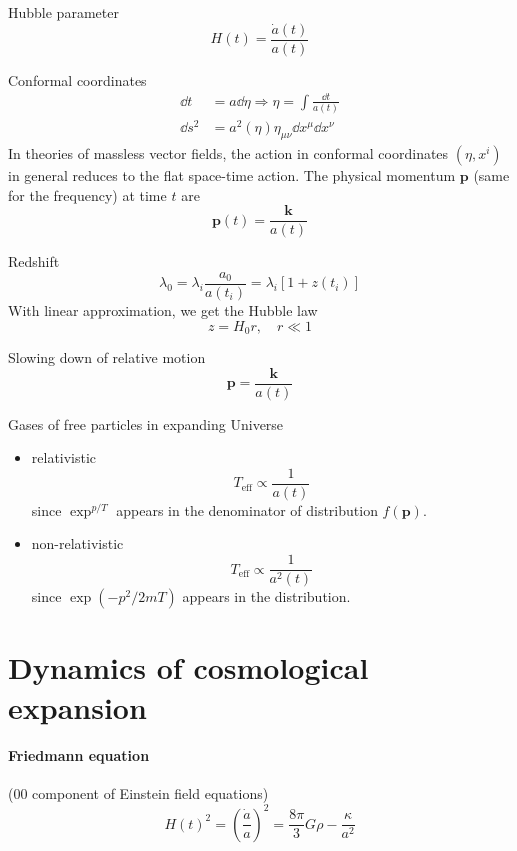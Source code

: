 \documentclass[12pt, a4paper, DIV=15]{article}
\numberwithin{equation}{section}
\newcommand{\eff}{\text{eff}}
\begin{document}
Hubble parameter
\begin{equation}
   H(t) = \frac{\dot a(t)}{a(t)}
\end{equation}

Conformal coordinates
\begin{align}
   \dd{t} &= a \dd{\eta} \Rightarrow \eta = \int \frac{\dd{t}}{a(t)}\\
   \dd{s^2} &= a^2(\eta) \eta_{\mu\nu} \dd{x^\mu} \dd{x^\nu}
\end{align}
In theories of massless vector fields, the action in conformal coordinates $(\eta, x^i)$ in general reduces to the flat space-time action. The physical momentum $\pmb{p}$ (same for the frequency) at time $t$ are
\begin{equation}
   \pmb{p} (t) = \frac{\pmb{k}}{a(t)}
\end{equation}

Redshift
\begin{equation}
   \lambda_0 = \lambda_i \frac{a_0}{a(t_i)} = \lambda_i \left[  1 + z(t_i) \right]
\end{equation}
With linear approximation, we get the Hubble law
\begin{equation}
   z = H_0 r, \quad r \ll 1
\end{equation}

Slowing down of relative motion
\begin{equation}
   \pmb{p} = \frac{\pmb{k}}{a(t)}
\end{equation}

Gases of free particles in expanding Universe
\begin{itemize}
   \item relativistic
      \begin{equation}
         T_\eff \propto \frac{1}{a(t)}
      \end{equation}
      since $\exp^{p/T}$ appears in the denominator of distribution $f(\pmb{p})$.
   \item non-relativistic
      \begin{equation}
         T_\eff \propto \frac{1}{a^2(t)}
      \end{equation}
      since $\exp(-p^2/2mT)$ appears in the distribution.
\end{itemize}

\section{Dynamics of cosmological expansion}
\paragraph{Friedmann equation} ($00$ component of Einstein field equations)
\begin{equation}
   H(t)^2 = \left ( \frac{\dot{a}}{a} \right)^2  = \frac{8\pi}{3} G \rho - \frac{\kappa}{a^2}
   \label{Friedmann}
\end{equation}
\end{document}
